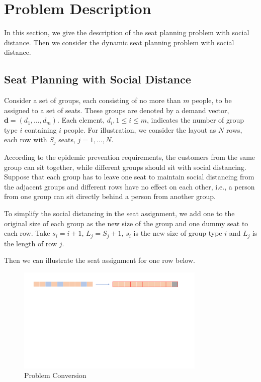 \section{Problem Description}
In this section, we give the description of the seat planning problem with social distance. Then we consider the dynamic seat planning problem with social distance.


\subsection{Seat Planning with Social Distance}

Consider a set of groups, each consisting of no more than $m$ people, to be assigned to a set of seats. These groups are denoted by a demand vector, $\mathbf{d} = (d_1, \ldots, d_m)$. Each element, $d_i, 1 \leq i \leq m$, indicates the number of group type $i$ containing $i$ people. For illustration, we consider the layout as $N$ rows, each row with $S_{j}$ seats, $j = 1, \ldots, N$. 


According to the epidemic prevention requirements, the customers from the same group can sit together, while different groups should sit with social distancing. 
Suppose that each group has to leave one seat to maintain social distancing from the adjacent groups and different rows have no effect on each other, i.e., a person from one group can sit directly behind a person from another group.

To simplify the social distancing in the seat assignment, we add one to the original size of each group as the new size of the group and one dummy seat to each row. Take $s_{i} = i + 1$, $L_{j} = S_{j} +1$, $s_{i}$ is the new size of group type $i$ and $L_{j}$ is the length of row $j$.

Then we can illustrate the seat assignment for one row below. 

\begin{figure}[ht]
    \centering
    \includegraphics[width = 0.8\textwidth]{./Figures/dummy_seat.pdf}
    \caption{Problem Conversion}
\end{figure}

